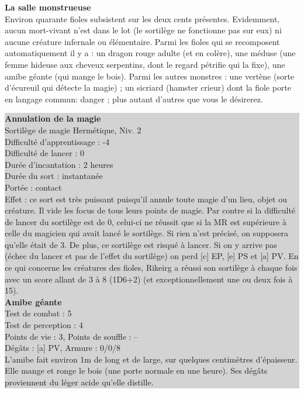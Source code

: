\documentclass[11pt,twoside,a4paper]{article}
\begin{document}
\begin{multicols}{3}
{\textbf{La salle monstrueuse}~\\

Environ quarante fioles subsistent sur les deux cents pr{\'e}sentes. Evidemment, aucun mort-vivant n'est dans le lot (le sortil{\`e}ge ne fonctionne pas sur eux) ni aucune cr{\'e}ature infernale ou {\'e}l{\'e}mentaire. Parmi les fioles qui se recomposent automatiquement il y a : un dragon rouge adulte (et en col{\`e}re), une m{\'e}duse (une femme hideuse aux cheveux serpentins, dont le regard p{\'e}trifie qui la fixe), une amibe g{\'e}ante (qui mange le bois). Parmi les autres monstres : une vert{\`e}ne (sorte d'{\'e}cureuil qui d{\'e}tecte la magie) ; un sicriard (hamster crieur) dont la fiole porte en langage commun: danger ; plus autant d'autres que vous le d{\'e}sirerez. ~\\


\colorbox{lightgrey}{ %
\begin{minipage}[ht]{0.30\textwidth}
\textbf{Annulation de la magie}~\\

Sortil{\`e}ge de magie Herm{\'e}tique, Niv. 2~\\
Difficult{\'e} d'apprentissage : -4~\\
Difficult{\'e} de lancer : 0~\\
Dur{\'e}e d'incantation : 2 heures~\\
Dur{\'e}e du sort : instantan{\'e}e~\\
Port{\'e}e : contact~\\
Effet : ce sort est tr{\`e}s puissant puisqu'il annule toute magie d'un lieu, objet ou cr{\'e}ature. Il vide les focus de tous leurs points de magie. Par contre si la difficult{\'e} de lancer du sortil{\`e}ge est de 0, celui-ci ne r{\'e}ussit que si la MR est sup{\'e}rieure {\`a} celle du magicien qui avait lanc{\'e} le sortil{\`e}ge. Si rien n'est pr{\'e}cis{\'e}, on supposera qu'elle {\'e}tait de 3. De plus, ce sortil{\`e}ge est risqu{\'e} {\`a} lancer. Si on y arrive pas ({\'e}chec du lancer et pas de l'effet du sortil{\`e}ge) on perd [c] EP, [e] PS et [a] PV. En ce qui concerne les cr{\'e}atures des fioles, Rikeirg a r{\'e}ussi son sortil{\`e}ge {\`a} chaque fois avec un score allant de 3 {\`a} 8 (1D6+2) (et exceptionnellement une ou deux fois {\`a} 15).~\\

\textbf{Amibe g{\'e}ante}~\\

Test de combat : 5~\\
Test de perception : 4~\\
Points de vie : 3, Points de souffle : -- ~\\
D{\'e}g{\^a}ts : [a] PV, Armure : 0/0/8~\\
L'amibe fait environ 1m de long et de large, sur quelques centim{\`e}tres d'{\'e}paisseur. Elle mange et ronge le bois (une porte normale en une heure). Ses d{\'e}g{\^a}ts proviennent du l{\'e}ger acide qu'elle distille.~\\


\end{minipage}}}
\end{multicols}
\end{document}
